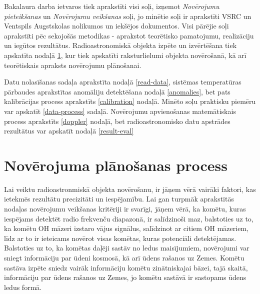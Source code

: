 Bakalaura darba ietvaros tiek aprakstīti visi soļi, izņemot \textit{Novērojumu pieteikšanas} un \textit{Novērojumu veikšanas} soļi, jo minētie soļi ir aprakstīti VSRC un Ventspils Augstskolas nolikumos un iekšējos dokumentos. Visi pārējie soļi aprakstīti pēc sekojošās metodikas - aprakstot teorētisko pamatojumu, realizāciju un iegūtos rezultātus. Radioastronomiskā objekta izpēte un izvērtēšana tiek apskatīta nodaļā \ref{planning}, kur tiek apskatīti raksturlielumi objekta novērošanā, kā arī teorētiskais apraksts novērojumu plānošanai.

Datu nolasīšanas sadaļa aprakstīta nodaļā \ref{read-data}, sistēmas temperatūras pārbaudes aprakstītas anomāliju detektēšana nodaļā \ref{anomalies}, bet pats kalibrācijas process aprakstīts \ref{calibration} nodaļā. Minēto soļu praktisku piemēru var apskatīt \ref{data-process} sadaļā. Novērojumu apvienošanas matemātiskais process aprakstīts \ref{doppler} nodaļā, bet radioastronomisko datu apstrādes rezultātus var apskatīt nodaļā \ref{result-eval}

\section{Novērojuma plānošanas process} \label{planning}



Lai veiktu radioastronmiskā objekta novērošanu, ir jāņem vērā vairāki faktori, kas ietekmēs rezultātu precizitāti un iespējamību. Lai gan turpmāk aprakstītās nodaļas novērojumu veikšanas kritēriji ir svarīgi, jāņem vērā, ka komētu, kuras iespējams detektēt radio frekvenču diapazonā, ir salīdzinoši maz, balstoties uz to, ka komētu OH māzeri izstaro vājus signālus, salīdzinot ar citiem OH māzeriem, līdz ar to ir ieteicams novērot visas komētas, kuras potenciāli detektējamas. Balstoties uz to, ka komētas daļēji sastāv no ledus maisījumiem, novērojumi var sniegt informāciju par ūdeni kosmosā, kā arī ūdens rašanos uz Zemes. Komētu sastāva izpēte sniedz vairāk informāciju komētu zinātniskajai bāzei, tajā skaitā, informāciju par ūdens rašanos uz Zemes, jo komētu sastāvā ir sastopams ūdens ledus formā. 


